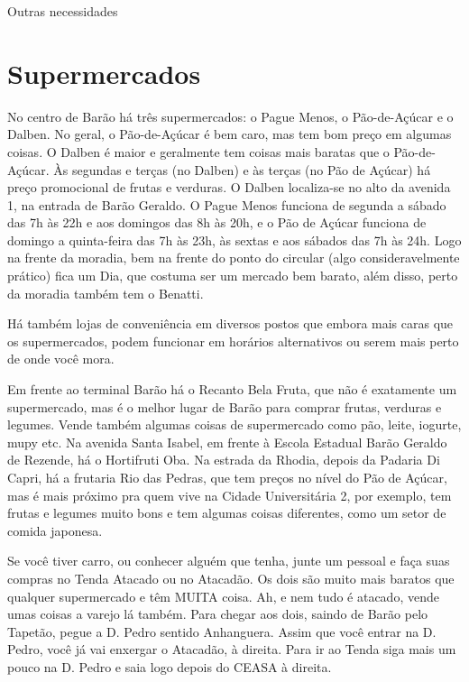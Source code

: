 
\begin{story}{Outras necessidades}

\section*{Supermercados}

No centro de Barão há três supermercados: o Pague Menos, o Pão-de-Açúcar e o Dalben. No geral, o Pão-de-Açúcar é bem caro, mas tem bom preço em algumas coisas. O Dalben é maior e geralmente tem coisas mais baratas que o Pão-de-Açúcar. Às segundas e terças (no Dalben) e às terças (no Pão de Açúcar) há preço promocional de frutas e verduras. O Dalben localiza-se no alto da avenida 1, na entrada de Barão Geraldo. O Pague Menos funciona de segunda a sábado das 7h às 22h e aos domingos das 8h às 20h, e o Pão de Açúcar funciona de domingo a quinta-feira das 7h às 23h, às sextas e aos sábados das 7h às 24h. Logo na frente da moradia, bem na frente do ponto do circular (algo consideravelmente prático) fica um Dia, que costuma ser um mercado bem barato, além disso, perto da moradia também tem o Benatti.

Há também lojas de conveniência em diversos postos que embora mais caras que os supermercados, podem funcionar em horários alternativos ou serem mais perto de onde você mora.

Em frente ao terminal Barão há o Recanto Bela Fruta, que não é exatamente um supermercado, mas é o melhor lugar de Barão para comprar frutas, verduras e legumes. Vende também algumas coisas de supermercado como pão, leite, iogurte, mupy etc. Na avenida Santa Isabel, em frente à Escola Estadual Barão Geraldo de Rezende, há o Hortifruti Oba. Na estrada da Rhodia, depois da Padaria Di Capri, há a frutaria Rio das Pedras, que tem preços no nível do Pão de Açúcar, mas é mais próximo pra quem vive na Cidade Universitária 2, por exemplo, tem frutas e legumes muito bons e tem algumas coisas diferentes, como um setor de comida japonesa.

Se você tiver carro, ou conhecer alguém que tenha, junte um pessoal e faça suas compras no Tenda Atacado ou no Atacadão. Os dois são muito mais baratos que qualquer supermercado e têm MUITA coisa. Ah, e nem tudo é atacado, vende umas coisas a varejo lá também. Para chegar aos dois, saindo de Barão pelo Tapetão, pegue a D. Pedro sentido Anhanguera. Assim que você entrar na D. Pedro, você já vai enxergar o Atacadão, à direita. Para ir ao Tenda siga mais um pouco na D. Pedro e saia logo depois do CEASA à direita.


\end{story}
